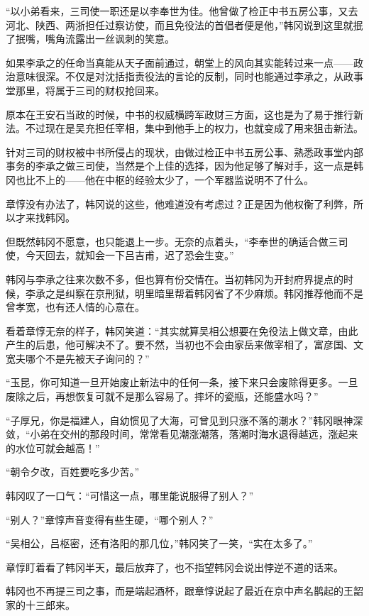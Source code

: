 “以小弟看来，三司使一职还是以李奉世为佳。他曾做了检正中书五房公事，又去河北、陕西、两浙担任过察访使，而且免役法的首倡者便是他，”韩冈说到这里就抿了抿嘴，嘴角流露出一丝讽刺的笑意。

如果李承之的任命当真能从天子面前通过，朝堂上的风向其实能转过来一点——政治意味很深。不仅是对沈括指责役法的言论的反制，同时也能通过李承之，从政事堂那里，将属于三司的财权抢回来。

原本在王安石当政的时候，中书的权威横跨军政财三方面，这也是为了易于推行新法。不过现在是吴充担任宰相，集中到他手上的权力，也就变成了用来狙击新法。

针对三司的财权被中书所侵占的现状，由做过检正中书五房公事、熟悉政事堂内部事务的李承之做三司使，当然是个上佳的选择，因为他足够了解对手，这一点是韩冈也比不上的——他在中枢的经验太少了，一个军器监说明不了什么。

章惇没有办法了，韩冈说的这些，他难道没有考虑过？正是因为他权衡了利弊，所以才来找韩冈。

但既然韩冈不愿意，也只能退上一步。无奈的点着头，“李奉世的确适合做三司使，今天回去，就知会一下吕吉甫，迟了恐会生变。”

韩冈与李承之往来次数不多，但也算有份交情在。当初韩冈为开封府界提点的时候，李承之是纠察在京刑狱，明里暗里帮着韩冈省了不少麻烦。韩冈推荐他而不是曾孝宽，也有还人情的心意在。

看着章惇无奈的样子，韩冈笑道：“其实就算吴相公想要在免役法上做文章，由此产生的后患，他可解决不了。要不然，当初也不会由家岳来做宰相了，富彦国、文宽夫哪个不是先被天子询问的？”

“玉昆，你可知道一旦开始废止新法中的任何一条，接下来只会废除得更多。一旦废除之后，再想恢复可就不是那么容易了。摔坏的瓷瓶，还能盛水吗？”

“子厚兄，你是福建人，自幼惯见了大海，可曾见到只涨不落的潮水？”韩冈眼神深敛，“小弟在交州的那段时间，常常看见潮涨潮落，落潮时海水退得越远，涨起来的水位可就会越高！”

“朝令夕改，百姓要吃多少苦。”

韩冈叹了一口气：“可惜这一点，哪里能说服得了别人？”

“别人？”章惇声音变得有些生硬，“哪个别人？”

“吴相公，吕枢密，还有洛阳的那几位，”韩冈笑了一笑，“实在太多了。”

章惇盯着看了韩冈半天，最后放弃了，也不指望韩冈会说出悖逆不道的话来。

韩冈也不再提三司之事，而是端起酒杯，跟章惇说起了最近在京中声名鹊起的王韶家的十三郎来。

